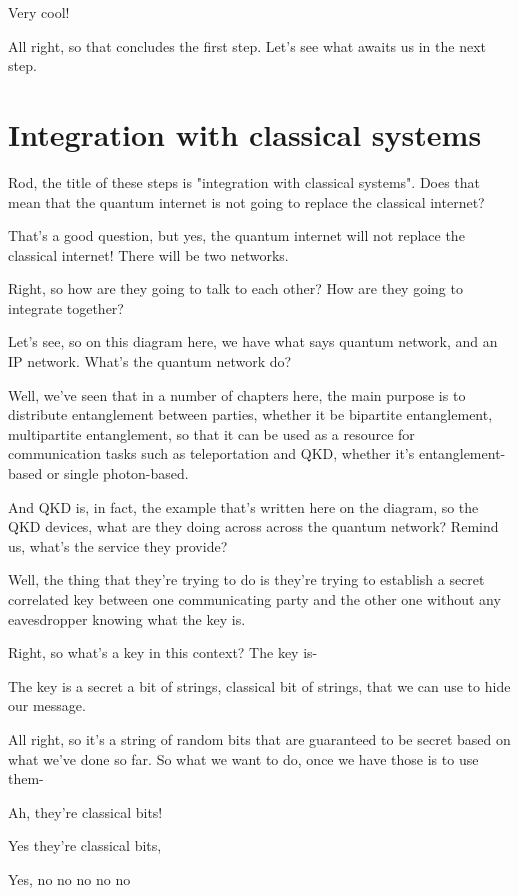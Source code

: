 Very cool!

All right, so that concludes the first step. Let's see what awaits us in the next step.

\section{Integration with classical systems}
\label{sec:classical-integration}


Rod, the title of these steps is "integration with classical systems". Does that mean that the quantum internet is not going to replace the classical internet?

That's a good question, but yes, the quantum internet will not replace the classical internet! There will be two networks.

Right, so how are they going to talk to each other? How are they going to integrate together?

Let's see, so on this diagram here, we have what says quantum network, and an IP network. What's the quantum network do?

Well, we've seen that in a number of chapters here, the main purpose is to distribute entanglement between parties, whether it be bipartite entanglement, multipartite entanglement, so that it can be used as a resource for communication tasks such as teleportation and QKD, whether it's entanglement-based or single photon-based.

And QKD is, in fact, the example that's written here on the diagram, so the QKD devices, what are they doing across across the quantum network? Remind us, what's the service they provide?

Well, the thing that they're trying to do is they're trying to establish a secret correlated key between one communicating party and the other one without any eavesdropper knowing what the key is.

Right, so what's a key in this context? The key is-

The key is a secret a bit of strings, classical bit of strings, that we can use to hide our message.

All right, so it's a string of random bits that are guaranteed to be secret based on what we've done so far. So what we want to do, once we have those is to use them-

Ah, they're classical bits!

Yes they're classical bits,

Yes, no no no no no

